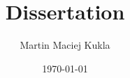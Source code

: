 \documentclass[a4paper]{article}
\title{Dissertation}
\date{\today}
\author{Martin Maciej Kukla}
\begin{document}


\begin{abstract}

\end{abstract}


\tableofcontents
\listoffigures















\appendix



\end{document}
